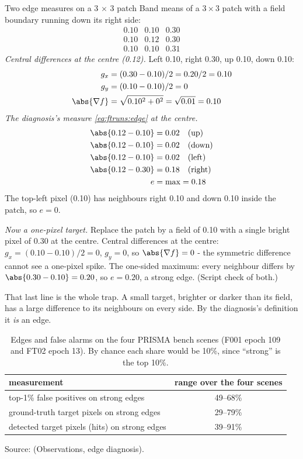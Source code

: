 \begin{worked}[label={we:ftruns:edges}]{Two edge measures on a 3 \texorpdfstring{$\times$}{x} 3 patch}
Band means of a $3 \times 3$ patch with a field boundary running down its right side:
\[
\begin{matrix}
0.10 & 0.10 & 0.30\\
0.10 & 0.12 & 0.30\\
0.10 & 0.10 & 0.31
\end{matrix}
\]
\emph{Central differences at the centre (0.12).} Left 0.10, right 0.30, up 0.10, down 0.10:
\begin{align*}
g_x &= (0.30 - 0.10) / 2 = 0.20 / 2 = 0.10\\
g_y &= (0.10 - 0.10) / 2 = 0\\
\abs{\nabla f} &= \sqrt{0.10^2 + 0^2} = \sqrt{0.01} = 0.10
\end{align*}
\emph{The diagnosis's measure \eqref{eq:ftruns:edge} at the centre.}
\begin{align*}
\abs{0.12 - 0.10} &= 0.02 \quad\text{(up)}\\
\abs{0.12 - 0.10} &= 0.02 \quad\text{(down)}\\
\abs{0.12 - 0.10} &= 0.02 \quad\text{(left)}\\
\abs{0.12 - 0.30} &= 0.18 \quad\text{(right)}\\
e &= \max = 0.18
\end{align*}
The top-left pixel (0.10) has neighbours right 0.10 and down 0.10 inside the patch, so $e = 0$.

\emph{Now a one-pixel target.} Replace the patch by a field of 0.10 with a single bright pixel of 0.30 at the centre.
Central differences at the centre: $g_x = (0.10 - 0.10)/2 = 0$, $g_y = 0$, so $\abs{\nabla f} = 0$ - the
symmetric difference cannot see a one-pixel spike. The one-sided maximum: every neighbour differs by $\abs{0.30 -
0.10} = 0.20$, so $e = 0.20$, a strong edge. (Script check of both\tagC.)
\end{worked}

That last line is the whole trap. A small target, brighter or darker than its field, has a large difference to its
neighbours on every side. By the diagnosis's definition it \emph{is} an edge.

\begin{table}[htbp]
\centering
\caption{Edges and false alarms on the four PRISMA bench scenes (F001 epoch 109 and FT02 epoch 13). By chance each
share would be 10\%, since ``strong'' is the top 10\%.}
\label{tab:ftruns:edges}
\small
\begin{tabular}{lc}
\toprule
measurement & range over the four scenes \\
\midrule
top-1\% false positives on strong edges & 49--68\% \\
ground-truth target pixels on strong edges & 29--79\% \\
detected target pixels (hits) on strong edges & 39--91\% \\
\bottomrule
\end{tabular}

\smallskip
{\footnotesize Source:  (Observations, edge diagnosis).}
\end{table}

